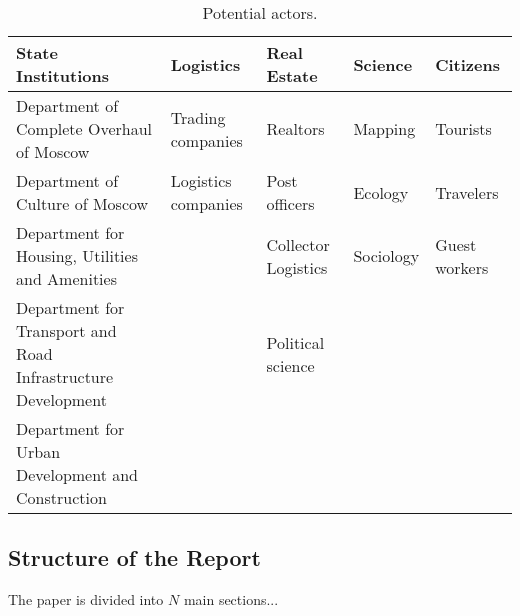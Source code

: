 \begin{table}[ht]
  \renewcommand{\arraystretch}{1.5}
  \centering
  \footnotesize
  \begin{tabular}{p{4cm} p{2.5cm} p{2.5cm} p{1.5cm} p{2.2cm}}
    \hline
    \textbf{State Institutions} & \textbf{Logistics} &\textbf{Real Estate}
    & \textbf{Science} & \textbf{Citizens} \\
    \hline

    Department of Complete Overhaul of Moscow &
    Trading companies &
    Realtors &
    Mapping &
    Tourists \\


    Department of Culture of Moscow &
    Logistics companies &
    Post officers &
    Ecology &
    Travelers  \\


    Department for Housing, Utilities and Amenities &
    &
    Collector Logistics &
    Sociology &
    Guest workers \\


    Department for Transport and Road Infrastructure Development
    &
    &
    Political science &
    \\


    Department for Urban Development and Construction &
    &
    &
    &
    \\

    \hline
  \end{tabular}

  \caption{Potential actors.}
  \label{tab:actors}
\end{table}

\subsection{ Structure of the Report }
The paper is divided into $N$ main sections...